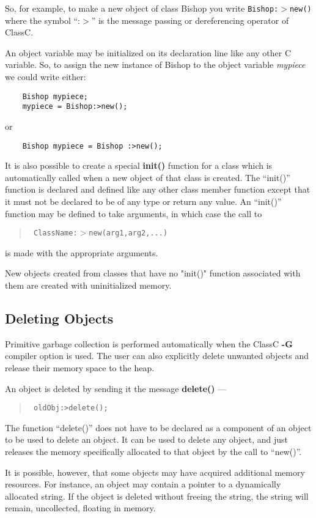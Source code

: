 So, for example, to make a new object of class Bishop you write
{\tt Bishop:$>$new()} where the symbol ``:$>$'' is the message passing
or dereferencing operator of ClassC.

An object variable may be initialized on its declaration line like any other
C variable.  So, to assign the new instance of Bishop to the object variable
{\em mypiece}
we could write either:
\begin{verbatim}
	Bishop mypiece;
	mypiece = Bishop:>new();
\end{verbatim}

or

\begin{verbatim}
	Bishop mypiece = Bishop :>new();
\end{verbatim}

It is also possible to create a special {\bf init()} function for a class
which is automatically called when a new object of that class is created.
The ``init()'' function is declared and defined like any other class member
function except that it must not be declared to be of any type or return
any value.  An ``init()'' function may be defined to take arguments,
in which case the call to
\begin{quote} \tt
ClassName:$>$new(arg1,arg2,...)
\end{quote}
is made with the appropriate arguments.

New objects created from classes that have no "init()" function associated
with them are created with uninitialized memory.


\subsection{Deleting Objects}
Primitive garbage collection is performed automatically when the ClassC {\bf -G}
compiler option is used.  The user can also explicitly delete unwanted
objects and release their memory space to the heap.

An object is deleted by sending it the message {\bf delete()} ---
\begin{quote} \tt
oldObj:>delete();
\end{quote}

The function ``delete()'' does not have to be declared as a component of
an object to be used to delete an object.  It can be used to delete
any object, and just releases the memory specifically allocated to
that object by the call to ``new()''.

It is possible, however, that some objects may have acquired additional
memory resources.  For instance, an object may contain a pointer to a
dynamically allocated string.  If the object is deleted without freeing
the string, the string will remain, uncollected, floating in memory.

